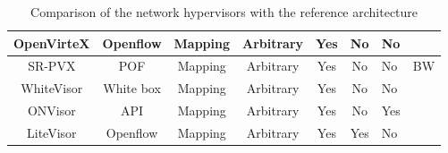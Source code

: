\begin{table}[ht]
{\begin{tabular}{|c|c|c|c|c|c|l|c|}
OpenVirteX               & Openflow                  & Mapping       & Arbitrary     & Yes & No  & No       &                    \\ \hline
SR-PVX                   & POF                       & Mapping       & Arbitrary     & Yes & No  & No       & BW                 \\ \hline
WhiteVisor               & White box                 & Mapping       & Arbitrary     & Yes & No  & No       &                    \\ \hline
ONVisor                  & API                       & Mapping       & Arbitrary     & Yes & No  & Yes      &                    \\ \hline
LiteVisor                & Openflow                  & Mapping       & Arbitrary     & Yes & Yes & No       &                    \\ \hline
\end{tabular}%
}
\caption{Comparison of the network hypervisors with the reference architecture}
\label{tab:comparison-refarchi}
\end{table}